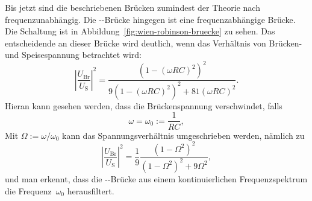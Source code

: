 Bis jetzt sind die beschriebenen Brücken zumindest der Theorie nach
frequenzunabhängig. Die --Brücke hingegen ist
eine frequenzabhängige Brücke. Die Schaltung ist in
Abbildung~\ref{fig:wien-robinson-bruecke} zu sehen. Das entscheidende an
dieser Brücke wird deutlich, wenn das Verhältnis von Brücken- und
Speisespannung betrachtet wird:
%
\begin{equation} 
  \left|\frac{U_\text{Br}}{U_\text{S}}\right|^2 =
  \frac{(1 - (\omega R C)^2)^2}{9(1 - (\omega R C)^2)^2 + 81 (\omega R
    C)^2}.
\end{equation}
%
Hieran kann gesehen werden, dass die Brückenspannung verschwindet, falls
%
\begin{equation} 
  \omega = \omega_0 := \frac{1}{RC},
\end{equation} 
%
Mit $\Omega := \omega/\omega_0$ kann das Spannungsverhältnis
umgeschrieben werden, nämlich zu
%
\begin{equation}
  \label{eq:wien_robinson_theo}
  \left|\frac{U_\text{Br}}{U_\text{S}}\right|^2 = \frac{1}{9} \frac{(1 -
    \Omega^2)^2}{(1 - \Omega^2)^2 + 9 \Omega^2},
\end{equation}
%
und man erkennt, dass die --Brücke aus einem
kontinuierlichen Frequenzspektrum die Frequenz~$\omega_0$ herausfiltert.

